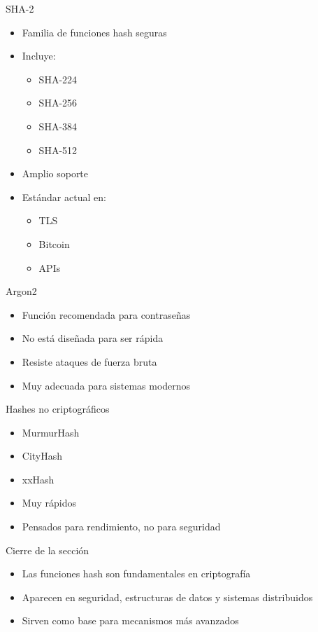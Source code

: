 \documentclass{beamer}
\begin{document}
\begin{frame}{SHA-2}
\begin{itemize}
  \item Familia de funciones hash seguras
  \item Incluye:
  \begin{itemize}
    \item SHA-224
    \item SHA-256
    \item SHA-384
    \item SHA-512
  \end{itemize}
  \item Amplio soporte
  \item Estándar actual en:
  \begin{itemize}
    \item TLS
    \item Bitcoin
    \item APIs
  \end{itemize}
\end{itemize}
\end{frame}

\begin{frame}{Argon2}
\begin{itemize}
  \item Función recomendada para contraseñas
  \item No está diseñada para ser rápida
  \item Resiste ataques de fuerza bruta
  \item Muy adecuada para sistemas modernos
\end{itemize}
\end{frame}

\begin{frame}{Hashes no criptográficos}
\begin{itemize}
  \item MurmurHash
  \item CityHash
  \item xxHash
  \item Muy rápidos
  \item Pensados para rendimiento, no para seguridad
\end{itemize}
\end{frame}

\begin{frame}{Cierre de la sección}
\begin{itemize}
  \item Las funciones hash son fundamentales en criptografía
  \item Aparecen en seguridad, estructuras de datos y sistemas distribuidos
  \item Sirven como base para mecanismos más avanzados
\end{itemize}
\end{frame}
\end{document}
